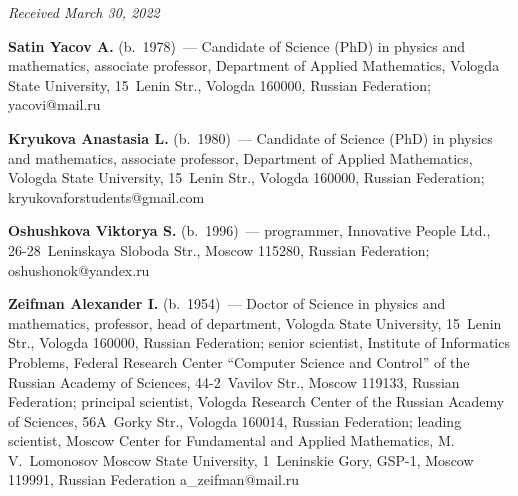 \hfill{\small\textit{Received March 30, 2022}}   

\Contr

\noindent
\textbf{Satin Yacov A.} (b.\ 1978)~---  Candidate of Science (PhD) in physics and mathematics, 
associate professor,  Department of Applied Mathematics, Vologda State University, 15~Lenin Str., 
Vologda 160000, Russian Federation; \mbox{yacovi@mail.ru}

\vspace*{3pt}
 
\noindent
\textbf{Kryukova Anastasia L.} (b.\ 1980)~--- 
Candidate of Science (PhD) in physics and mathematics, associate professor, Department 
of Applied Mathematics, Vologda State University, 15~Lenin Str., Vologda 160000, Russian Federation; 
\mbox{kryukovaforstudents@gmail.com}

\vspace*{3pt}
 
\noindent
\textbf{Oshushkova Viktorya S.} (b.\ 1996)~--- programmer, Innovative People Ltd., 26-28~Leninskaya Sloboda 
Str., Moscow 115280, Russian Federation; \mbox{oshushonok@yandex.ru}

\vspace*{3pt}
 
\noindent
\textbf{Zeifman Alexander I.} (b.\ 1954)~--- Doctor of Science in physics and mathematics, professor, 
head of department, Vologda State University, 15~Lenin Str., Vologda 160000, Russian Federation; 
senior scientist, Institute of Informatics Problems, Federal Research Center 
``Computer Science and Control'' of the Russian Academy of Sciences, 44-2~Vavilov Str., 
Moscow 119133, Russian Federation; 
principal scientist, Vologda Research Center of the Russian Academy of Sciences, 56A~Gorky Str., 
Vologda 160014, Russian Federation; leading scientist, 
Moscow Center for Fundamental and Applied Mathematics, M.\,V.~Lomonosov Moscow State University, 1~Leninskie Gory, GSP-1, Moscow 119991, Russian Federation
\mbox{a\_zeifman@mail.ru}




\label{end\stat}

\renewcommand{\bibname}{\protect\rm Литература}   